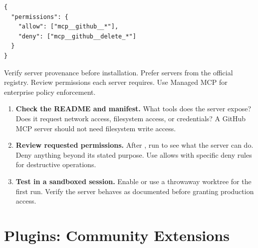 

\begin{verbatim}
{
  "permissions": {
    "allow": ["mcp__github__*"],
    "deny": ["mcp__github__delete_*"]
  }
}
\end{verbatim}


\begin{warnbox}
Verify server provenance before installation.
Prefer servers from the official registry.
Review permissions each server requires.
Use Managed MCP for enterprise policy enforcement.
\end{warnbox}


\begin{enumerate}
  \item \textbf{Check the README and manifest.}
    What tools does the server expose? Does it request network access,
    filesystem access, or credentials? A GitHub MCP server should not
    need filesystem write access.
  \item \textbf{Review requested permissions.}
    After , run  to see what
    the server can do. Deny anything beyond its stated purpose.
    Use  allows with specific deny rules
    for destructive operations.
  \item \textbf{Test in a sandboxed session.}
    Enable  or use a throwaway worktree for the first run.
    Verify the server behaves as documented before granting production access.
\end{enumerate}


\section{Plugins: Community Extensions}
\label{sec:plugins}

